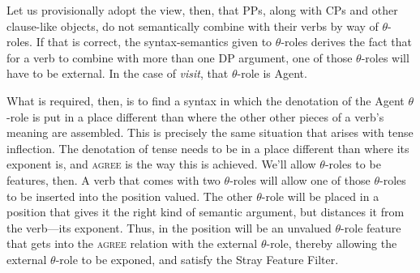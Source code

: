 Let us provisionally adopt the view, then, that PPs, along with CPs and other clause-like objects, do not semantically combine with their verbs by way of $\theta$-roles. If that is correct, the syntax-semantics given to $\theta$-roles derives the fact that for a verb to combine with more than one DP argument, one of those $\theta$-roles will have to be external. In the case of \emph{visit}, that $\theta$-role is Agent.

What is required, then, is to find a syntax in which the denotation of the Agent $\theta$-role is put in a place different than where the other other pieces of a verb's meaning are assembled. This is precisely the same situation that arises with tense inflection. The denotation of tense needs to be in a place different than where its exponent is, and \textsc{agree} is the way this is achieved. We'll allow $\theta$-roles to be features, then. A verb that comes with two $\theta$-roles will allow one of those $\theta$-roles to be inserted into the  position valued. The other $\theta$-role will be placed in a position that gives it the right kind of semantic argument, but distances it from the verb---its exponent. Thus, in the  position will be an unvalued $\theta$-role feature that gets into the \textsc{agree} relation with the external $\theta$-role, thereby allowing the external $\theta$-role to be exponed, and satisfy the Stray Feature Filter. 

